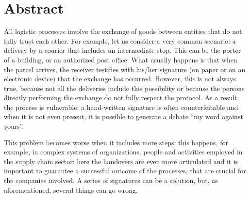 \chapter*{Abstract} %
\label{abstract}


\iffalse



  Sommario è un breve riassunto del lavoro svolto dove si descrive l'obiettivo, l'oggetto della tesi, le 
metodologie e le tecniche usate, i dati elaborati e la spiegazione delle conclusioni alle quali siete arrivati.  

Il sommario dell’elaborato consiste al massimo di 3 pagine e deve contenere le seguenti informazioni:
\begin{itemize}
  \item contesto e motivazioni 
  \item breve riassunto del problema affrontato
  \item tecniche utilizzate e/o sviluppate
  \item risultati raggiunti, sottolineando il contributo personale del laureando/a
\end{itemize}

\fi

All logistic processes involve the exchange of goods between entities that do not fully trust each other. For example, let us consider a very common scenario: a delivery by a courier that includes an intermediate stop. This can be the porter of a building, or an authorized post office. What usually happens is that when the parcel arrives, the receiver testifies with his/her signature (on paper or on an electronic device) that the exchange has occurred. However, this is not always true, because not all the deliveries include this possibility or because the persons directly performing the exchange do not fully respect the protocol. As a result, the process is vulnerable: a hand-written signature is often counterfeitable and when it is not even present, it is possible to generate a debate ``my word against yours''.

This problem becomes worse when it includes more steps: this happens, for example, in complex systems of organizations, people and activities employed in the supply chain sector: here the handovers are even more articulated and it is important to guarantee a successful outcome of the processes, that are crucial for the companies involved. A series of signatures can be a solution, but, as aforementioned, several things can go wrong.

